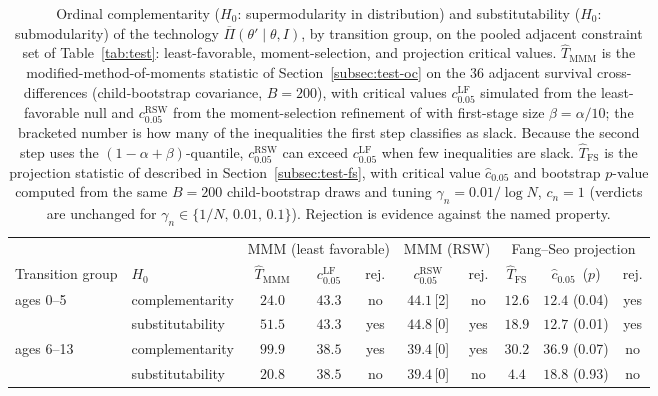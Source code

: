 \begin{table}[htbp]
\centering\small
\begin{tabular}{@{}llcccccccc@{}}
\toprule
 & & \multicolumn{3}{c}{MMM (least favorable)} & \multicolumn{2}{c}{MMM (RSW)} & \multicolumn{3}{c}{Fang--Seo projection} \\
\cmidrule(lr){3-5}\cmidrule(lr){6-7}\cmidrule(lr){8-10}
Transition group & $H_0$ & $\hat T_{\mathrm{MMM}}$ & $c^{\mathrm{LF}}_{0.05}$ & rej. & $c^{\mathrm{RSW}}_{0.05}$ & rej. & $\hat T_{\mathrm{FS}}$ & $\hat c_{0.05}$ \,($p$) & rej. \\ \midrule
ages 0--5 & complementarity & $24.0$ & $43.3$ & no & $44.1$\,[2] & no & $12.6$ & $12.4$ (0.04) & yes \\
 & substitutability & $51.5$ & $43.3$ & yes & $44.8$\,[0] & yes & $18.9$ & $12.7$ (0.01) & yes \\
\midrule
ages 6--13 & complementarity & $99.9$ & $38.5$ & yes & $39.4$\,[0] & yes & $30.2$ & $36.9$ (0.07) & no \\
 & substitutability & $20.8$ & $38.5$ & no & $39.4$\,[0] & no & $4.4$ & $18.8$ (0.93) & no \\
\bottomrule
\end{tabular}
\caption{Ordinal complementarity ($H_0$: supermodularity in distribution) and substitutability ($H_0$: submodularity) of the technology $\overline\Pi(\theta'\mid\theta,I)$, by transition group, on the pooled adjacent constraint set of Table~\ref{tab:test}: least-favorable, moment-selection, and projection critical values. $\hat T_{\mathrm{MMM}}$ is the modified-method-of-moments statistic of
Section~\ref{subsec:test-oc} on the 36 adjacent survival cross-differences
(child-bootstrap covariance, $B=200$), with critical values $c^{\mathrm{LF}}_{0.05}$
simulated from the least-favorable null and $c^{\mathrm{RSW}}_{0.05}$ from the
moment-selection refinement of \citet{Romano_Shaikh_Wolf-2014-ECTA} with first-stage size
$\beta=\alpha/10$; the bracketed number is how many of the inequalities the first step
classifies as slack. Because the second step uses the $(1-\alpha+\beta)$-quantile,
$c^{\mathrm{RSW}}_{0.05}$ can exceed $c^{\mathrm{LF}}_{0.05}$ when few inequalities are
slack. $\hat T_{\mathrm{FS}}$ is the projection statistic of
\citet{Fang_Seo-2021-ECTA} described in Section~\ref{subsec:test-fs}, with critical value
$\hat c_{0.05}$ and bootstrap $p$-value computed from the same $B=200$ child-bootstrap
draws and tuning $\gamma_n=0.01/\log N$, $c_n=1$ (verdicts are unchanged for
$\gamma_n\in\{1/N,\,0.01,\,0.1\}$). Rejection is evidence against the named property.}
\label{tab:test_comparison}
\end{table}
